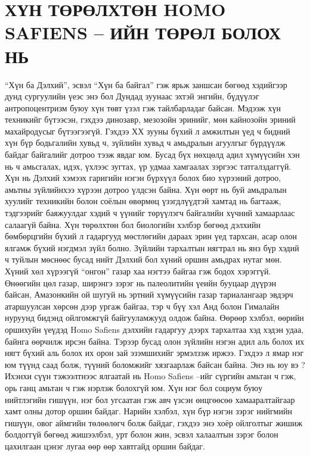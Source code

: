 \section*{ХҮН ТӨРӨЛХТӨН HOMO SAFIENS – ИЙН ТӨРӨЛ БОЛОХ НЬ}

“Хүн ба Дэлхий”, эсвэл “Хүн ба байгал” гэж ярьж заншсан бөгөөд хэдийгээр дунд сургуулийн үеэс энэ бол Дундад зуунаас эхтэй энгийн, бүдүүлэг антропоцентризм буюу хүн төвт үзэл гэж тайлбарладаг байсан. Мэдээж хүн техникийг бүтээсэн, гэхдээ динозавр, мезозойн эринийг, мөн кайнозойн эриний махайродусыг бүтээгээгүй. Гэхдээ ХХ зууны бүхий л амжилтын үед ч бидний хүн бүр бодьгалийн хувьд ч, зүйлийн хувьд ч амьдралын агуулгыг бүрдүүлж байдаг байгалийг дотроо тээж явдаг юм. Бусад бүх нөхцөлд адил хүмүүсийн хэн нь ч амьсгалах, идэх, үхлээс зугтах, үр удмаа хамгаалах зэргээс татгалздаггүй. Хүн нь Дэлхий хэмээх гаригийн нэгэн бүрхүүл болох био хүрээний дотроо, амьтны зүйлийнхээ хүрээн дотроо үлдсэн байна. Хүн өөрт нь буй амьдралын хуулийг техникийн болон соёлын өвөрмөц үзэгдлүүдтэй хамтад нь багтааж, тэдгээрийг баяжуулдаг хэдий ч үүнийг төрүүлэгч байгалийн хүчний хамаарлаас салаагүй байна.
Хүн төрөлхтөн бол биологийн хэлбэр бөгөөд дэлхийн бөмбөрцгийн бүхий л гадаргууд мөстлөгийн дараах эрин үед тархсан, асар олон ялгамж бүхий нэгдмэл зүйл болно. Зүйлийн тархалтын нягтрал нь янз бүр хэдий ч туйлын мөснөөс бусад нийт Дэлхий бол хүний оршин амьдрах нутаг мөн. Хүний хөл хүрээгүй “онгон” газар хаа нэгтээ байгаа гэж бодох хэрэггүй. Өнөөгийн цөл газар, ширэнгэ зэрэг нь палеолитийн үеийн бууцаар дүүрэн байсан, Амазонкийн ой шугуй нь эртний хүмүүсийн газар тариалангаар эвдэрч атаршуулсан хөрсөн дээр ургаж байгаа, тэр ч бүү хэл Анд болон Гималайн нуруунд бидэнд ойлгомжгүй байгууламжууд олдож байна. Өөрөөр хэлбэл, өөрийн оршихуйн үеүдэд Homo Safiens дэлхийн гадаргуу дээрх тархалтаа хэд хэдэн удаа, байнга өөрчилж ирсэн байна. Тэрээр бусад олон зүйлийн нэгэн адил аль болох их нягт бүхий аль болох их орон зай эзэмшихийг эрмэлзэж иржээ. Гэхдээ л ямар нэг юм түүнд саад болж, түүний боломжийг хязгаарлаж байсан байна. Энэ нь юу вэ ?
Ихэнхи сүүн тэжээлтнээс ялгаатай нь Homo Safiens –ийг сүргийн амьтан ч гэж, орь ганц амьтан ч гэж нэрлэж болохгүй юм. Хүн нэг бол социум буюу нийтлэгийн гишүүн, нэг бол угсаатан гэж авч үзсэн өнцгөөсөө хамааралтайгаар хамт олны дотор оршин байдаг. Нарийн хэлбэл, хүн бүр нэгэн зэрэг нийгмийн гишүүн, овог аймгийн төлөөлөгч болж байдаг, гэхдээ энэ хоёр ойлголтыг жишиж болдоггүй бөгөөд жишээлбэл, урт болон жин, эсвэл халаалтын зэрэг болон цахилгаан цэнэг лугаа өөр өөр хавтгайд оршин байдаг.
